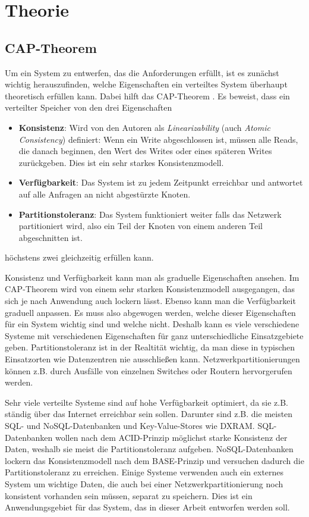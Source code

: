 \chapter{Theorie}
\label{theory}

\section{CAP-Theorem}
\label{cap}

Um ein System zu entwerfen, das die Anforderungen erfüllt, ist es zunächst wichtig herauszufinden, welche Eigenschaften ein verteiltes System überhaupt theoretisch erfüllen kann. Dabei hilft das CAP-Theorem \cite{cap}. Es beweist, dass ein verteilter Speicher von den drei Eigenschaften 
\begin{itemize}
	\item \textbf{Konsistenz}: Wird von den Autoren als \textit{Linearizability} (auch \textit{Atomic Consistency}) definiert: Wenn ein Write abgeschlossen ist, müssen alle Reads, die danach beginnen, den Wert des Writes oder eines späteren Writes zurückgeben. Dies ist ein sehr starkes Konsistenzmodell.
	\item \textbf{Verfügbarkeit}: Das System ist zu jedem Zeitpunkt erreichbar und antwortet auf alle Anfragen an nicht abgestürzte Knoten.
	\item \textbf{Partitionstoleranz}: Das System funktioniert weiter falls das Netzwerk partitioniert wird, also ein Teil der Knoten von einem anderen Teil abgeschnitten ist.
\end{itemize}
 höchstens zwei gleichzeitig erfüllen kann. 

Konsistenz und Verfügbarkeit kann man als graduelle Eigenschaften ansehen. Im CAP-Theorem wird von einem sehr starken Konsistenzmodell ausgegangen, das sich je nach Anwendung auch lockern lässt. Ebenso kann man die Verfügbarkeit graduell anpassen. Es muss also abgewogen werden, welche dieser Eigenschaften für ein System wichtig sind und welche nicht. Deshalb kann es viele verschiedene Systeme mit verschiedenen Eigenschaften für ganz unterschiedliche Einsatzgebiete geben. Partitionstoleranz ist in der Realtität wichtig, da man diese in typischen Einsatzorten wie Datenzentren nie ausschließen kann. Netzwerkpartitionierungen können z.B. durch Ausfälle von einzelnen Switches oder Routern hervorgerufen werden. 

Sehr viele verteilte Systeme sind auf hohe Verfügbarkeit optimiert, da sie z.B. ständig über das Internet erreichbar sein sollen. Darunter sind z.B. die meisten SQL- und NoSQL-Datenbanken und Key-Value-Stores wie DXRAM. SQL-Datenbanken wollen nach dem ACID-Prinzip möglichst starke Konsistenz der Daten, weshalb sie meist die Partitionstoleranz aufgeben. NoSQL-Datenbanken lockern das Konsistenzmodell nach dem BASE-Prinzip und versuchen dadurch die Partitionstoleranz zu erreichen. Einige Systeme verwenden auch ein externes System um wichtige Daten, die auch bei einer Netzwerkpartitionierung noch konsistent vorhanden sein müssen, separat zu speichern. Dies ist ein Anwendungsgebiet für das System, das in dieser Arbeit entworfen werden soll.

